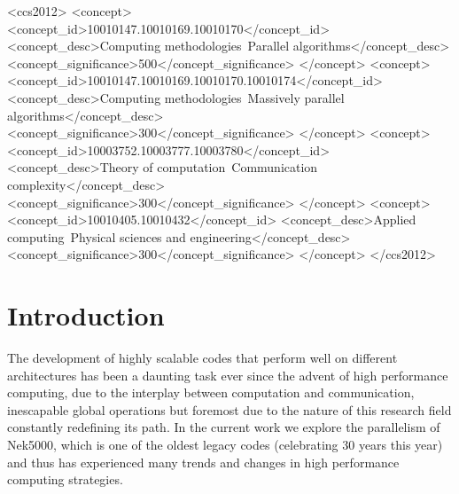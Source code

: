 \documentclass{sig-alternate}
\begin{document}
%
 \begin{CCSXML}
<ccs2012>
<concept>
<concept_id>10010147.10010169.10010170</concept_id>
<concept_desc>Computing methodologies~Parallel algorithms</concept_desc>
<concept_significance>500</concept_significance>
</concept>
<concept>
<concept_id>10010147.10010169.10010170.10010174</concept_id>
<concept_desc>Computing methodologies~Massively parallel algorithms</concept_desc>
<concept_significance>300</concept_significance>
</concept>
<concept>
<concept_id>10003752.10003777.10003780</concept_id>
<concept_desc>Theory of computation~Communication complexity</concept_desc>
<concept_significance>300</concept_significance>
</concept>
<concept>
<concept_id>10010405.10010432</concept_id>
<concept_desc>Applied computing~Physical sciences and engineering</concept_desc>
<concept_significance>300</concept_significance>
</concept>
</ccs2012>
\end{CCSXML}



%
%

%
%
\printccsdesc



\section{Introduction}
The development of highly scalable codes that perform well on different
architectures has been a daunting task ever since the advent of high performance
computing, due to the interplay between computation and communication,
inescapable global operations but foremost due to the nature of this research
field constantly redefining its path. In the current work we explore the parallelism 
of Nek5000, which is one of the oldest legacy codes (celebrating 30 years this year) 
and thus has experienced many trends and changes in high performance computing strategies.
\end{document}
